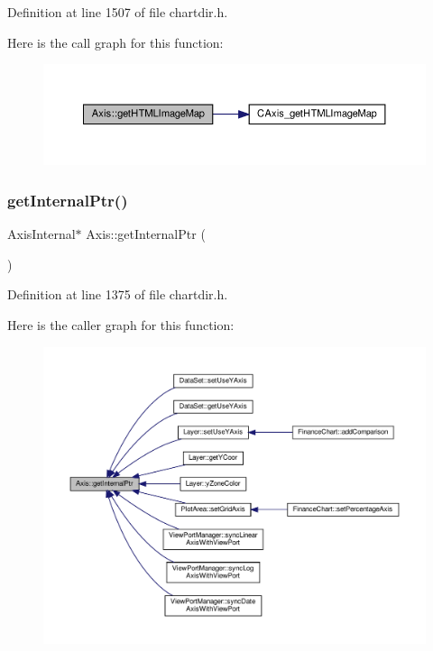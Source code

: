 Definition at line 1507 of file chartdir.\+h.

Here is the call graph for this function\+:
\nopagebreak
\begin{figure}[H]
\begin{center}
\leavevmode
\includegraphics[width=350pt]{class_axis_a278e6559be3e7201f1e6e986f4562042_cgraph}
\end{center}
\end{figure}
\mbox{\label{class_axis_af5704ff02fb2e04aa16f4a4ecefc072b}} 
\subsubsection{\texorpdfstring{get\+Internal\+Ptr()}{getInternalPtr()}\hspace{0.1cm}{\footnotesize\ttfamily [1/2]}}
{\footnotesize\ttfamily Axis\+Internal$\ast$ Axis\+::get\+Internal\+Ptr (\begin{DoxyParamCaption}{ }\end{DoxyParamCaption})\hspace{0.3cm}{\ttfamily [inline]}}



Definition at line 1375 of file chartdir.\+h.

Here is the caller graph for this function\+:
\nopagebreak
\begin{figure}[H]
\begin{center}
\leavevmode
\includegraphics[width=350pt]{class_axis_af5704ff02fb2e04aa16f4a4ecefc072b_icgraph}
\end{center}
\end{figure}
\mbox{\label{class_axis_a376d55c978b25b17319af851a2f53f06}} 
